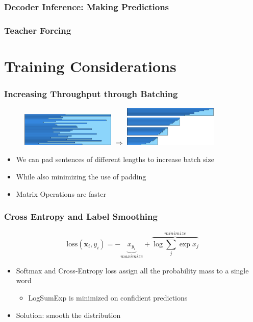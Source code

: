 \documentclass{beamer}
\begin{document}
\begin{frame}
\frametitle{Decoder Inference: Making Predictions}

\end{frame}

\begin{frame}
\frametitle{Teacher Forcing}

\end{frame}


\section{Training Considerations}

\begin{frame}
\frametitle{Increasing Throughput through Batching}
\begin{figure}
  \centering
  \includegraphics[width=4.5cm, valign=c]{assets/full_batch}
  \quad
  $\Longrightarrow$
  \quad
  \includegraphics[width=4.5cm, valign=c]{assets/mini_batch}
\end{figure}
\begin{itemize}
  \item We can pad sentences of different lengths to increase batch size
  \item While also minimizing the use of padding
  \item Matrix Operations are faster
\end{itemize}
\end{frame}


\begin{frame}
\frametitle{Cross Entropy and Label Smoothing}
\begin{equation*}
  \text{loss}(\mathbf{x}_i, y_i) = -\underbrace{x_{y_i}}_{maximize} + \overbrace{\log \sum_j \exp x_j}^{minimize}
\end{equation*}
\begin{itemize}
  \item Softmax and Cross-Entropy loss assign all the probability mass to a single word
  \begin{itemize}
    \item LogSumExp is minimized on confidient predictions
  \end{itemize}
  \item Solution: smooth the distribution
\end{itemize}
\end{frame}
\end{document}
